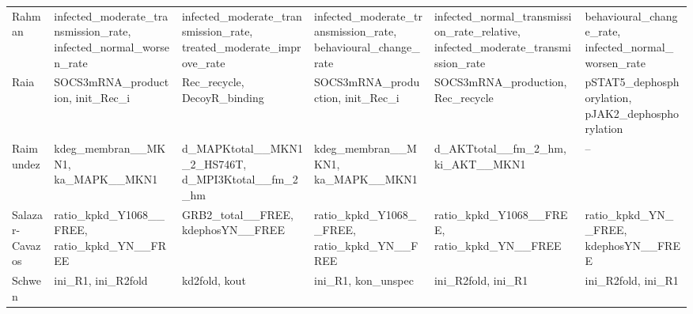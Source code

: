 \begin{longtable}{@{}l>{\raggedright}p{2.6cm}>{\raggedright}p{2.6cm}>{\raggedright}p{2.6cm}>{\raggedright}p{2.6cm}>{\raggedright\arraybackslash}p{2.6cm}@{}}
Rahman & infected\_\allowbreak{}moderate\_\allowbreak{}transmission\_\allowbreak{}rate, infected\_\allowbreak{}normal\_\allowbreak{}worsen\_\allowbreak{}rate & infected\_\allowbreak{}moderate\_\allowbreak{}transmission\_\allowbreak{}rate, treated\_\allowbreak{}moderate\_\allowbreak{}improve\_\allowbreak{}rate & infected\_\allowbreak{}moderate\_\allowbreak{}transmission\_\allowbreak{}rate, behavioural\_\allowbreak{}change\_\allowbreak{}rate & infected\_\allowbreak{}normal\_\allowbreak{}transmission\_\allowbreak{}rate\_\allowbreak{}relative, infected\_\allowbreak{}moderate\_\allowbreak{}transmission\_\allowbreak{}rate & behavioural\_\allowbreak{}change\_\allowbreak{}rate, infected\_\allowbreak{}normal\_\allowbreak{}worsen\_\allowbreak{}rate \\
Raia & SOCS3mRNA\_\allowbreak{}production, init\_\allowbreak{}Rec\_\allowbreak{}i & Rec\_\allowbreak{}recycle, DecoyR\_\allowbreak{}binding & SOCS3mRNA\_\allowbreak{}production, init\_\allowbreak{}Rec\_\allowbreak{}i & SOCS3mRNA\_\allowbreak{}production, Rec\_\allowbreak{}recycle & pSTAT5\_\allowbreak{}dephosphorylation, pJAK2\_\allowbreak{}dephosphorylation \\
Raimundez & kdeg\_\allowbreak{}membran\_\allowbreak{}\_\allowbreak{}MKN1, ka\_\allowbreak{}MAPK\_\allowbreak{}\_\allowbreak{}MKN1 & d\_\allowbreak{}MAPKtotal\_\allowbreak{}\_\allowbreak{}MKN1\_\allowbreak{}2\_\allowbreak{}HS746T, d\_\allowbreak{}MPI3Ktotal\_\allowbreak{}\_\allowbreak{}fm\_\allowbreak{}2\_\allowbreak{}hm & kdeg\_\allowbreak{}membran\_\allowbreak{}\_\allowbreak{}MKN1, ka\_\allowbreak{}MAPK\_\allowbreak{}\_\allowbreak{}MKN1 & d\_\allowbreak{}AKTtotal\_\allowbreak{}\_\allowbreak{}fm\_\allowbreak{}2\_\allowbreak{}hm, ki\_\allowbreak{}AKT\_\allowbreak{}\_\allowbreak{}MKN1 & -- \\
Salazar-Cavazos & ratio\_\allowbreak{}kpkd\_\allowbreak{}Y1068\_\allowbreak{}\_\allowbreak{}FREE, ratio\_\allowbreak{}kpkd\_\allowbreak{}YN\_\allowbreak{}\_\allowbreak{}FREE & GRB2\_\allowbreak{}total\_\allowbreak{}\_\allowbreak{}FREE, kdephosYN\_\allowbreak{}\_\allowbreak{}FREE & ratio\_\allowbreak{}kpkd\_\allowbreak{}Y1068\_\allowbreak{}\_\allowbreak{}FREE, ratio\_\allowbreak{}kpkd\_\allowbreak{}YN\_\allowbreak{}\_\allowbreak{}FREE & ratio\_\allowbreak{}kpkd\_\allowbreak{}Y1068\_\allowbreak{}\_\allowbreak{}FREE, ratio\_\allowbreak{}kpkd\_\allowbreak{}YN\_\allowbreak{}\_\allowbreak{}FREE & ratio\_\allowbreak{}kpkd\_\allowbreak{}YN\_\allowbreak{}\_\allowbreak{}FREE, kdephosYN\_\allowbreak{}\_\allowbreak{}FREE \\
Schwen & ini\_\allowbreak{}R1, ini\_\allowbreak{}R2fold & kd2fold, kout & ini\_\allowbreak{}R1, kon\_\allowbreak{}unspec & ini\_\allowbreak{}R2fold, ini\_\allowbreak{}R1 & ini\_\allowbreak{}R2fold, ini\_\allowbreak{}R1 \\

\end{longtable}
